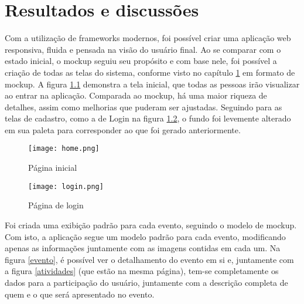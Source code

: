 \chapter{Resultados e discussões}\label{chp:LABEL_CHP_5}
\label{resultados}
Com a utilização de frameworks modernos, foi possível criar uma aplicação web responsiva, fluida e pensada na visão do usuário final. Ao se comparar com o estado inicial, o mockup seguiu seu propósito e com base nele, foi possível a criação de todas as telas do sistema, conforme visto no capítulo \ref{chp:LABEL_CHP_5} em formato de mockup. A figura \ref{home} demonstra a tela inicial, que todas as pessoas irão visualizar ao entrar na aplicação. Comparada ao mockup, há uma maior riqueza de detalhes, assim como melhorias que puderam ser ajustadas. Seguindo para as telas de cadastro, como a de Login na figura \ref{login}, o fundo foi levemente alterado em sua paleta para corresponder ao que foi gerado anteriormente. 

\begin{figure}[H]
    \caption{\label{home}Página inicial}
    \vspace{5pt}
    \centering
    \texttt{[image: home.png]}
    \vspace{5pt}
\end{figure}
\begin{figure}[H]
    \caption{\label{login}Página de login}
    \vspace{5pt}
    \centering
    \texttt{[image: login.png]}
    \vspace{5pt}
\end{figure}
Foi criada uma exibição padrão para cada evento, seguindo o modelo de mockup. Com isto, a aplicação segue um modelo padrão para cada evento, modificando apenas as informações juntamente com as imagens contidas em cada um. Na figura \ref{evento}, é possível ver o detalhamento do evento em si e, juntamente com a figura \ref{atividades} (que estão na mesma página), tem-se completamente os dados para a participação do usuário, juntamente com a descrição completa de quem e o que será apresentado no evento. 

